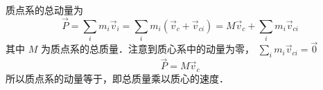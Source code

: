 
质点系的总动量为
\begin{equation}
\vec P = \sum_i m_i \vec v_i  = \sum_i m_i (\vec v_c + \vec v_{ci})  = M \vec v_c + \sum_i  m_i \vec v_{ci} 
\end{equation}
其中 $M$ 为质点系的总质量．注意到质心系中的动量为零， $\sum_i  m_i \vec v_{ci}  = \vec 0$
\begin{equation}\label{SysP_eq2}
\vec P = M \vec v_c
\end{equation}
所以质点系的动量等于，即总质量乘以质心的速度．
